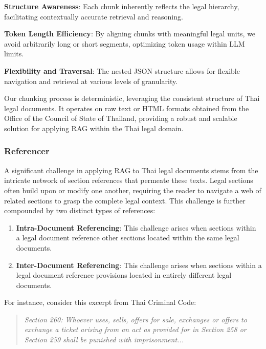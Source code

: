 \textbf{Structure Awareness}: Each chunk inherently reflects the legal hierarchy, facilitating contextually accurate retrieval and reasoning.

\textbf{Token Length Efficiency}: By aligning chunks with meaningful legal units, we avoid arbitrarily long or short segments, optimizing token usage within LLM limits.

\textbf{Flexibility and Traversal}: The nested JSON structure allows for flexible navigation and retrieval at various levels of granularity.


Our chunking process is deterministic, leveraging the consistent structure of Thai legal documents. It operates on raw text or HTML formats obtained from the Office of the Council of State of Thailand, providing a robust and scalable solution for applying RAG within the Thai legal domain.

\subsubsection{Referencer}
A significant challenge in applying RAG to Thai legal documents stems from the intricate network of section references that permeate these texts. Legal sections often build upon or modify one another, requiring the reader to navigate a web of related sections to grasp the complete legal context. This challenge is further compounded by two distinct types of references:
\begin{enumerate}
    \item \textbf{Intra-Document Referencing}: This challenge arises when sections within a legal document reference other sections located within the same legal documents.
    \item \textbf{Inter-Document Referencing}: This challenge arises when sections within a legal document reference provisions located in entirely different legal documents.
\end{enumerate}

For instance, consider this excerpt from Thai Criminal Code:

\begin{quote}
    \textit{Section 260: Whoever uses, sells, offers for sale, exchanges or offers to exchange a ticket arising from an act as provided for in Section 258 or Section 259 shall be punished with imprisonment...}
\end{quote}

